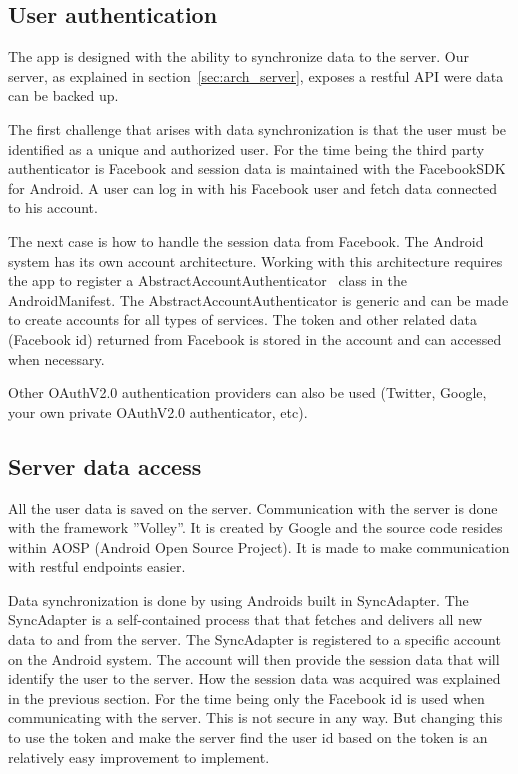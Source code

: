\subsection{User authentication}
The app is designed with the ability to synchronize data to the server. Our server, as explained in section~\ref{sec:arch_server}, exposes a restful API were data can be backed up.

The first challenge that arises with data synchronization is that the user must be identified as a unique and authorized user. 
For the time being the third party authenticator is Facebook and session data is maintained with the FacebookSDK for Android. 
A user can log in with his Facebook user and fetch data connected to his account.

The next case is how to handle the session data from Facebook. The Android system has its own account architecture. Working with this architecture requires the app to register a AbstractAccountAuthenticator~\cite{androidAccount} class in the AndroidManifest. The AbstractAccountAuthenticator is generic and can be made to create accounts for all types of services. The token and other related data (Facebook id) returned from Facebook is stored in the account and can accessed when necessary.

Other OAuthV2.0 authentication providers can also be used (Twitter, Google, your own private OAuthV2.0 authenticator, etc). 


\subsection{Server data access}
All the user data is saved on the server. Communication with the server is done with the framework ''Volley''. It is created by Google and the source code resides within AOSP (Android Open Source Project). It is made to make communication with restful endpoints easier.

Data synchronization is done by using Androids built in SyncAdapter. The SyncAdapter is a self-contained process that that fetches and delivers all new data to and from the server. The SyncAdapter is registered to a specific account on the Android system. The account will then provide the session data that will identify the user to the server. How the session data was acquired was explained in the previous section. For the time being only the Facebook id is used when communicating with the server. This is not secure in any way. But changing this to use the token and make the server find the user id based on the token is an relatively easy improvement to implement. 

